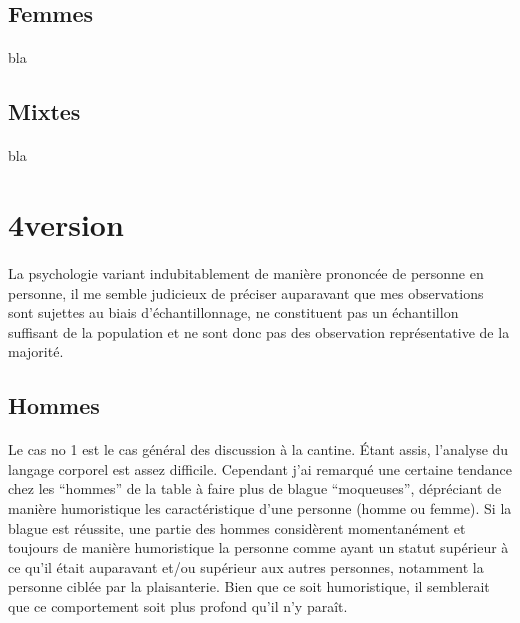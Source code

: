 \subsection{Femmes}

\paragraph{}
bla

\subsection{Mixtes}

\paragraph{}
bla

\section{4\ieme version}

\paragraph{} La psychologie variant indubitablement de manière prononcée de
personne en personne, il me semble judicieux de préciser auparavant que mes
observations sont sujettes au biais d'échantillonnage, ne constituent pas un
échantillon suffisant de la population et ne sont donc pas des observation
représentative de la majorité.

\subsection{Hommes}

\paragraph{} Le cas no 1 est le cas général des discussion à la cantine. Étant
assis, l'analyse du langage corporel est assez difficile. Cependant j'ai
remarqué une certaine tendance chez les “hommes” de la table à faire plus de
blague “moqueuses”, dépréciant de manière humoristique les caractéristique
d'une personne (homme ou femme). Si la blague est réussite, une partie des
hommes considèrent momentanément et toujours de manière humoristique la
personne comme ayant un statut supérieur à ce qu'il était auparavant et/ou
supérieur aux autres personnes, notamment la personne ciblée par la
plaisanterie. Bien que ce soit humoristique, il semblerait que ce comportement
soit plus profond qu'il n'y paraît.

